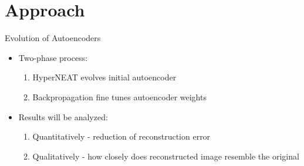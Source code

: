 \documentclass[xcolor=dvipsnames]{beamer}
\begin{document}
	\section{Approach}
	\begin{frame}{Evolution of Autoencoders}
		\begin{itemize}
			\item Two-phase process:
			\begin{enumerate}
				\item HyperNEAT evolves initial autoencoder
				\item Backpropagation fine tunes autoencoder weights
			\end{enumerate}
			
			\bigskip
			
			\item Results will be analyzed:
			\begin{enumerate}
				\item Quantitatively - reduction of reconstruction error
				\item Qualitatively - how closely does reconstructed image resemble the original
			\end{enumerate}
		\end{itemize}				
	\end{frame}
	
\end{document}
